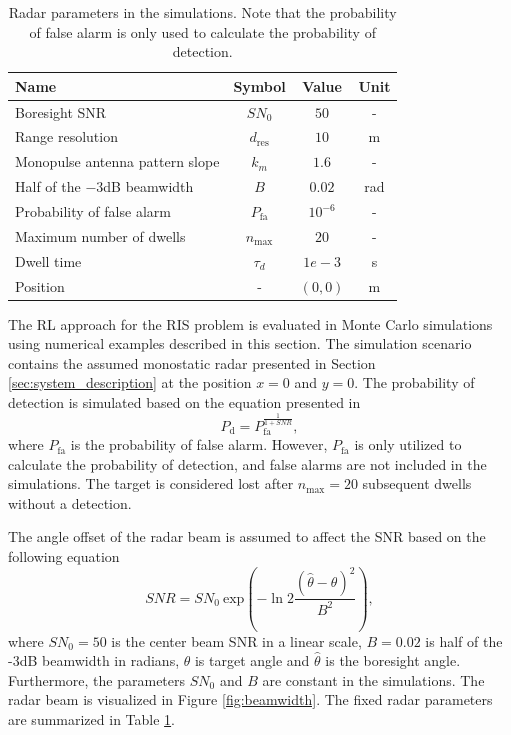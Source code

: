 \documentclass[english, 12pt, a4paper, elec, utf8, a-1b, online]{aaltothesis}
\numberwithin{equation}{section}
\newcommand{\sno}{SN_0}
\renewcommand{\exp}[1]{\text{exp}\left( #1 \right)}
\newcommand{\nmax}{n_\text{max}}
\begin{document}
\bgroup
\def \arraystretch{1.25}
\begin{table}[tb]
    \centering
    \begin{tabular}{|l|c|c|c|}
    \hline
    \textbf{Name}              & \textbf{Symbol} & \textbf{Value}  & \textbf{Unit}\\ \hline
    Boresight SNR              & $SN_0$          & $50$ & -          \\ \hline
    Range resolution            & $d_\text{res}$  & $10$ & m  \\ \hline
    Monopulse antenna pattern slope  & $k_m$      & $1.6$ & -  \\ \hline
    Half of the $-3$dB beamwidth & $B$             & $0.02$ & rad         \\ \hline
    Probability of false alarm & $P_\text{fa}$   & $10^{-6}$ & -      \\ \hline
    Maximum number of dwells   & $n_\text{max}$  & $20$ & -  \\ \hline
    Dwell time                 & $\tau_d$          & $1e-3$ & s   \\ \hline
    Position                   & -               & $(0, 0)$ & m \\ \hline
    \end{tabular}
    \caption{Radar parameters in the simulations. Note that the probability of false alarm is only used to calculate the probability of detection.}
    \label{tab:radar_parameters}
\end{table}
\egroup

The RL approach for the RIS problem is evaluated in Monte Carlo simulations using numerical examples described in this section.
The simulation scenario contains the assumed monostatic radar presented in Section \ref{sec:system_description} at the position $x=0$ and $y=0$. 
The probability of detection is simulated based on the equation presented in \cite{vanKeuk1993}
\begin{equation}\label{eq:singer_1_pd}
    P_\text{d} = P_\text{fa}^{\frac{1}{1+SNR}},
\end{equation}
where $P_\text{fa}$ is the probability of false alarm.
However, $P_\text{fa}$ is only utilized to calculate the probability of detection, and false alarms are not included in the simulations.
The target is considered lost after $\nmax=20$ subsequent dwells without a detection.

The angle offset of the radar beam is assumed to affect the SNR based on the following equation
\begin{equation} \label{eq:offset_snr}
    SNR = \sno~\exp{ - \ln{2}
        \frac
            {(\hat{\theta} - \theta)^2}
            {B^2}},
\end{equation}
where $\sno=50$ is the center beam SNR in a linear scale, $B=0.02$ is half of the -3dB beamwidth in radians, $\theta$ is target angle and $\hat{\theta} $ is the boresight angle. 
Furthermore, the parameters $\sno$ and $B$ are constant in the simulations. 
The radar beam is visualized in Figure \ref{fig:beamwidth}.
The fixed radar parameters are summarized in Table \ref{tab:radar_parameters}.
\end{document}
